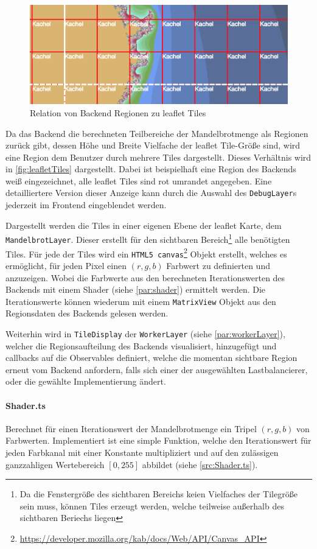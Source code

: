 \begin{figure}[h!]
	\centering
	\includegraphics[width=0.5\linewidth]{img/Implementierung/leafletTiles}
	\caption{Relation von Backend Regionen zu leaflet Tiles}
	\label{fig:leafletTiles}
\end{figure}

Da das Backend die berechneten Teilbereiche der Mandelbrotmenge als Regionen zurück gibt, dessen Höhe und Breite
Vielfache der leaflet Tile-Größe sind, wird eine Region dem Benutzer durch mehrere Tiles dargestellt.
Dieses Verhältnis wird in \autoref{fig:leafletTiles} dargestellt. Dabei ist beispielhaft eine Region des Backends
weiß eingezeichnet, alle leaflet Tiles sind rot umrandet angegeben. Eine detailliertere Version dieser Anzeige kann
durch die Auswahl des \verb|DebugLayer|s jederzeit im Frontend eingeblendet werden.

Dargestellt werden die Tiles in einer eigenen Ebene der leaflet Karte, dem \verb|MandelbrotLayer|.
Dieser erstellt für den sichtbaren Bereich\footnote{Da die Fenstergröße des sichtbaren Bereichs keien Vielfaches der Tilegröße sein muss, können Tiles erzeugt werden, welche teilweise außerhalb des sichtbaren Beriechs liegen}
alle benötigten Tiles. Für jede der Tiles wird ein \verb|HTML5 canvas|\footnote{\url{https://developer.mozilla.org/kab/docs/Web/API/Canvas_API}} Objekt erstellt, welches es
ermöglicht, für jeden Pixel einen \( (r,g,b) \) Farbwert zu definierten und anzuzeigen. Wobei die Farbwerte aus den berechneten
Iterationswerten des Backends mit einem Shader (siehe \autoref{par:shader}) ermittelt werden. Die Iterationswerte können wiederum
mit einem \verb|MatrixView| Objekt aus den Regionsdaten des Backends gelesen werden.

Weiterhin wird in \verb|TileDisplay| der \verb|WorkerLayer| (siehe \autoref{par:workerLayer}), welcher die Regionsaufteilung des Backends visualisiert,  hinzugefügt und callbacks auf die Observables definiert, welche die momentan sichtbare Region
erneut vom Backend anfordern, falls sich einer der ausgewählten Lastbalancierer, oder die gewählte Implementierung ändert.

\paragraph{Shader.ts}\label{par:shader}
Berechnet für einen Iterationswert der Mandelbrotmenge ein Tripel \( (r,g,b) \) von Farbwerten.
Implementiert ist eine simple Funktion, welche den Iterationswert für jeden Farbkanal mit einer Konstante multipliziert
und auf den zulässigen ganzzahligen Wertebereich \( [0,255] \) abbildet (siehe \autoref{src:Shader.ts}).

